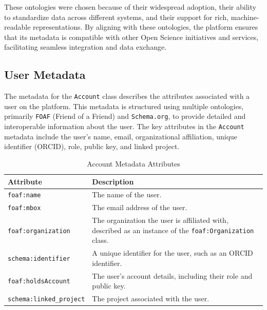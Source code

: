 \documentclass{article}
\begin{document}
These ontologies were chosen because of their widespread adoption, their ability to standardize data across different systems, and their support for rich, machine-readable representations. By aligning with these ontologies, the platform ensures that its metadata is compatible with other Open Science initiatives and services, facilitating seamless integration and data exchange.


\subsection{User Metadata}
The metadata for the \texttt{Account} class describes the attributes associated with a user on the platform. This metadata is structured using multiple ontologies, primarily \texttt{FOAF} (Friend of a Friend) and \texttt{Schema.org}, to provide detailed and interoperable information about the user. The key attributes in the \texttt{Account} metadata include the user's name, email, organizational affiliation, unique identifier (ORCID), role, public key, and linked project.

\begin{table}[h]
      \centering
      \label{tab:user_metadata}
      \renewcommand{\arraystretch}{1.2}
      \begin{tabularx}{\textwidth}{|l|X|}
            \hline
            \textbf{Attribute}              & \textbf{Description}                                                                                            \\ \hline
            \texttt{foaf:name}              & The name of the user.                                                                                           \\ \hline
            \texttt{foaf:mbox}              & The email address of the user.                                                                                  \\ \hline
            \texttt{foaf:organization}      & The organization the user is affiliated with, described as an instance of the \texttt{foaf:Organization} class. \\ \hline
            \texttt{schema:identifier}      & A unique identifier for the user, such as an ORCID identifier.                                                  \\ \hline
            \texttt{foaf:holdsAccount}      & The user's account details, including their role and public key.                                                \\ \hline
            \texttt{schema:linked\_project} & The project associated with the user.                                                                           \\ \hline
      \end{tabularx}
      \caption{Account Metadata Attributes}
\end{table}
\end{document}
